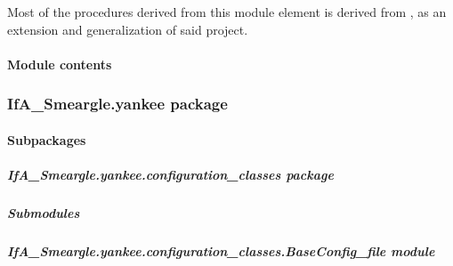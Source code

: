 \documentclass[letterpaper,10pt,english]{sphinxmanual}
\begin{document}
Most of the procedures derived from this module element is derived from
, as an extension and generalization of said project.


\paragraph{Module contents}
\label{\detokenize{python_docstrings/IfA_Smeargle.oscar:module-IfA_Smeargle.oscar}}\label{\detokenize{python_docstrings/IfA_Smeargle.oscar:module-contents}}

\subsubsection{IfA\_Smeargle.yankee package}
\label{\detokenize{python_docstrings/IfA_Smeargle.yankee:ifa-smeargle-yankee-package}}\label{\detokenize{python_docstrings/IfA_Smeargle.yankee::doc}}

\paragraph{Subpackages}
\label{\detokenize{python_docstrings/IfA_Smeargle.yankee:subpackages}}

\subparagraph{IfA\_Smeargle.yankee.configuration\_classes package}
\label{\detokenize{python_docstrings/IfA_Smeargle.yankee.configuration_classes:ifa-smeargle-yankee-configuration-classes-package}}\label{\detokenize{python_docstrings/IfA_Smeargle.yankee.configuration_classes::doc}}

\subparagraph{Submodules}
\label{\detokenize{python_docstrings/IfA_Smeargle.yankee.configuration_classes:submodules}}

\subparagraph{IfA\_Smeargle.yankee.configuration\_classes.BaseConfig\_file module}
\label{\detokenize{python_docstrings/IfA_Smeargle.yankee.configuration_classes.BaseConfig_file:module-IfA_Smeargle.yankee.configuration_classes.BaseConfig_file}}\label{\detokenize{python_docstrings/IfA_Smeargle.yankee.configuration_classes.BaseConfig_file:ifa-smeargle-yankee-configuration-classes-baseconfig-file-module}}\label{\detokenize{python_docstrings/IfA_Smeargle.yankee.configuration_classes.BaseConfig_file::doc}}
\end{document}
